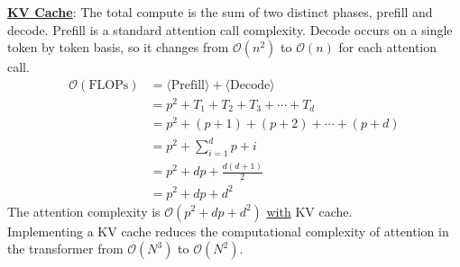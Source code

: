 \documentclass[12pt]{article}
\begin{document}
\begin{enumerate}[label=\textbf{Q\arabic*.}]
\begin{enumerate}
        \textbf{\underline{KV Cache}}: The total compute is the sum of two distinct phases, prefill and decode. Prefill is a standard attention call complexity. Decode occurs on a single token by token basis, so it changes from $\mathcal{O}\left(n^2\right)$ to $\mathcal{O}\left(n\right)$ for each attention call.
        \begin{align*}
            \mathcal{O}\left(\text{FLOPs}\right) &= \langle\text{Prefill}\rangle + \langle\text{Decode}\rangle \\
            &= p^2 + T_1 + T_2 + T_3 + \cdots + T_d \\
            &= p^2 + \left(p+1\right) + \left(p+2\right) + \cdots + \left(p+d\right) \\
            &= p^2 + \sum_{i=1}^d p+i \\
            &= p^2 + dp + \frac{d\left(d+1\right)}{2} \\
            &= p^2 + dp + d^2
        \end{align*}
        The attention complexity is $\boxed{\mathcal{O}\left(p^2 + dp + d^2\right)}$ \underline{with} KV cache.\\

        Implementing a KV cache reduces the computational complexity of attention in the transformer from $\mathcal{O}\left(N^3\right)$ to $\mathcal{O}\left(N^2\right)$.

    

\end{enumerate}
\end{enumerate}
\end{document}

